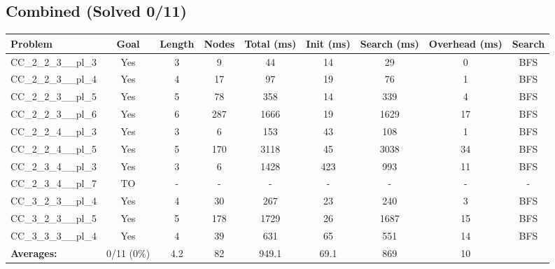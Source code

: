 \documentclass{article}
\begin{document}
\subsection*{Combined (Solved 0/11)}
\begin{tabular}{lcccccccc}
\toprule
Problem & Goal & Length & Nodes & Total (ms) & Init (ms) & Search (ms) & Overhead (ms) & Search \\
\midrule
CC\_2\_2\_3\_\_pl\_3 & Yes & 3 & 9 & 44 & 14 & 29 & 0 & BFS \\
CC\_2\_2\_3\_\_pl\_4 & Yes & 4 & 17 & 97 & 19 & 76 & 1 & BFS \\
CC\_2\_2\_3\_\_pl\_5 & Yes & 5 & 78 & 358 & 14 & 339 & 4 & BFS \\
CC\_2\_2\_3\_\_pl\_6 & Yes & 6 & 287 & 1666 & 19 & 1629 & 17 & BFS \\
CC\_2\_2\_4\_\_pl\_3 & Yes & 3 & 6 & 153 & 43 & 108 & 1 & BFS \\
CC\_2\_2\_4\_\_pl\_5 & Yes & 5 & 170 & 3118 & 45 & 3038 & 34 & BFS \\
CC\_2\_3\_4\_\_pl\_3 & Yes & 3 & 6 & 1428 & 423 & 993 & 11 & BFS \\
CC\_2\_3\_4\_\_pl\_7 & TO & - & - & - & - & - & - & - \\
CC\_3\_2\_3\_\_pl\_4 & Yes & 4 & 30 & 267 & 23 & 240 & 3 & BFS \\
CC\_3\_2\_3\_\_pl\_5 & Yes & 5 & 178 & 1729 & 26 & 1687 & 15 & BFS \\
CC\_3\_3\_3\_\_pl\_4 & Yes & 4 & 39 & 631 & 65 & 551 & 14 & BFS \\
\textbf{Averages:} & 0/11 (0\%) & 4.2 & 82 & 949.1 & 69.1 & 869 & 10 & \\
\bottomrule
\end{tabular}
\\[0.7cm]
\end{document}

